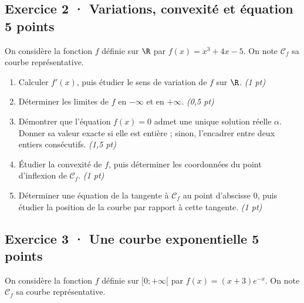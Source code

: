 \subsection*{Exercice 2 · Variations, convexité et équation \hfill 5 points}On considère la fonction $f$ définie sur $\R$ par $f(x)=x^3+4x-5$. On note $\mathcal C_f$ sa courbe représentative.

\begin{enumerate}

\item Calculer $f' (x)$, puis étudier le sens de variation de $f$ sur $\R$. \hfill\textit{(1 pt)}

\item Déterminer les limites de $f$ en $-\infty$ et en $+\infty$. \hfill\textit{(0,5 pt)}

\item Démontrer que l'équation $f(x)=0$ admet une unique solution réelle $\alpha$. Donner sa valeur exacte si elle est entière ; sinon, l'encadrer entre deux entiers consécutifs. \hfill\textit{(1,5 pt)}

\item Étudier la convexité de $f$, puis déterminer les coordonnées du point d'inflexion de $\mathcal C_f$. \hfill\textit{(1 pt)}

\item Déterminer une équation de la tangente à $\mathcal C_f$ au point d'abscisse $0$, puis étudier la position de la courbe par rapport à cette tangente. \hfill\textit{(1 pt)}

\end{enumerate}

\clearpage{}\par

\subsection*{Exercice 3 · Une courbe exponentielle \hfill 5 points}On considère la fonction $f$ définie sur $[0;+\infty[$ par $f(x)=(x+3)e^{-x}$. On note $\mathcal C_f$ sa courbe représentative.

